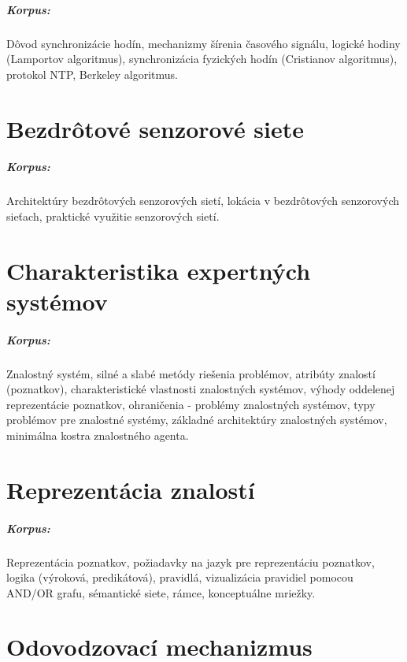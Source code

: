 \documentclass[11pt,a4paper]{report}
\begin{document}
\paragraph{Korpus:} Dôvod synchronizácie hodín, mechanizmy šírenia časového signálu, logické hodiny (Lamportov algoritmus), synchronizácia fyzických hodín (Cristianov algoritmus), protokol NTP, Berkeley algoritmus.

\chapter{Bezdrôtové senzorové siete}

\paragraph{Korpus:} Architektúry bezdrôtových senzorových sietí, lokácia v bezdrôtových senzorových sieťach, praktické využitie senzorových sietí. 

\chapter{Charakteristika expertných systémov}

\paragraph{Korpus:} Znalostný systém, silné a slabé metódy riešenia problémov, atribúty znalostí (poznatkov), charakteristické vlastnosti znalostných systémov, výhody oddelenej reprezentácie poznatkov, ohraničenia - problémy znalostných systémov, typy problémov pre znalostné systémy, základné architektúry znalostných systémov, minimálna kostra znalostného agenta.

\chapter{Reprezentácia znalostí}

\paragraph{Korpus:} Reprezentácia poznatkov, požiadavky na jazyk pre reprezentáciu poznatkov, logika (výroková, predikátová), pravidlá, vizualizácia pravidiel pomocou AND/OR grafu, sémantické siete, rámce, konceptuálne mriežky.

\chapter{Odovodzovací mechanizmus}
\end{document}
